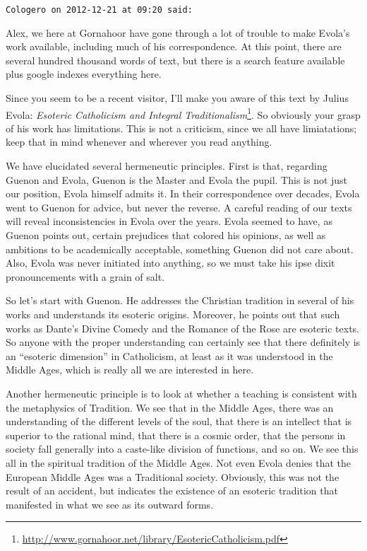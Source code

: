 \begin{footnotesize}
\begin{sffamily}
\texttt{Cologero on 2012-12-21 at 09:20 said:}

Alex, we here at Gornahoor have gone through a lot of trouble to make Evola's work available, including much of his correspondence. At this point, there are several hundred thousand words of text, but there is a search feature available plus google indexes everything here.

Since you seem to be a recent visitor, I'll make you aware of this text by Julius Evola:
\textit{Esoteric Catholicism and Integral Traditionalism}\footnote{\url{http://www.gornahoor.net/library/EsotericCatholicism.pdf}}. So obviously your grasp of his work has limitations. This is not a criticism, since we all have limiatations; keep that in mind whenever and wherever you read anything.

We have elucidated several hermeneutic principles. First is that, regarding Guenon and Evola, Guenon is the Master and Evola the pupil. This is not just our position, Evola himself admits it. In their correspondence over decades, Evola went to Guenon for advice, but never the reverse. A careful reading of our texts will reveal inconsistencies in Evola over the years. Evola seemed to have, as Guenon points out, certain prejudices that colored his opinions, as well as ambitions to be academically acceptable, something Guenon did not care about. Also, Evola was never initiated into anything, so we must take his ipse dixit pronouncements with a grain of salt.

So let's start with Guenon. He addresses the Christian tradition in several of his works and understands its esoteric origins. Moreover, he points out that such works as Dante's Divine Comedy and the Romance of the Rose are esoteric texts. So anyone with the proper understanding can certainly see that there definitely is an ``esoteric dimension'' in Catholicism, at least as it was understood in the Middle Ages, which is really all we are interested in here.

Another hermeneutic principle is to look at whether a teaching is consistent with the metaphysics of Tradition. We see that in the Middle Ages, there was an understanding of the different levels of the soul, that there is an intellect that is superior to the rational mind, that there is a cosmic order, that the persons in society fall generally into a caste-like division of functions, and so on. We see this all in the spiritual tradition of the Middle Ages. Not even Evola denies that the European Middle Ages was a Traditional society. Obviously, this was not the result of an accident, but indicates the existence of an esoteric tradition that manifested in what we see as its outward forms.


\end{sffamily}
\end{footnotesize}
